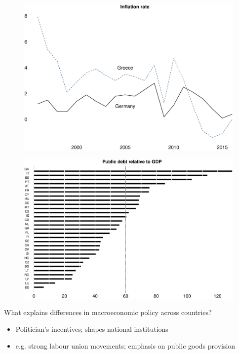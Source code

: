 \documentclass{beamer}
\begin{document}
\begin{frame}
  \begin{figure}
    \includegraphics[scale=.3]{inflation.eps}
  \end{figure}
\end{frame}

\begin{frame}
  \begin{figure}
    \includegraphics[scale=.3]{public_debt.eps}
  \end{figure}
\end{frame}

\begin{frame}
  What explains differences in macroeconomic policy across countries?
  \begin{itemize}
    \item Politician's incentives; shapes national institutions
    \item e.g. strong labour union movements; emphasis on public goods provision
  \end{itemize}  
\end{frame}
\end{document}
